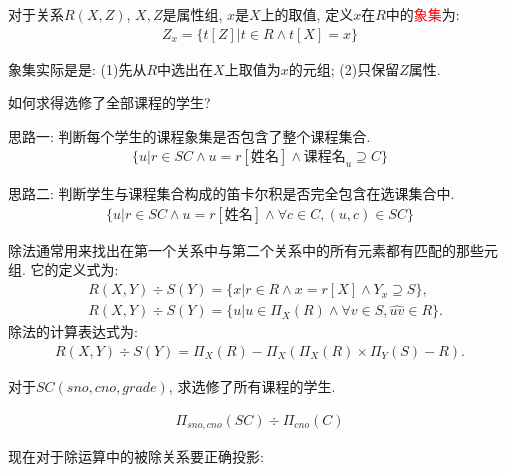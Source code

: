 \begin{definition}
    对于关系$R(X,Z)$, $X,Z$是属性组, $x$是$X$上的取值, 定义$x$在$R$中的\textcolor{red}{象集}为:
\begin{align*}
    Z_x = \{t[Z] | t\in R \land t[X]=x\}
\end{align*}
\end{definition}

\begin{remark}
    象集实际是是: (1)先从$R$中选出在$X$上取值为$x$的元组; (2)只保留$Z$属性.
\end{remark}

\begin{example}
如何求得选修了全部课程的学生?
\end{example}

思路一: 判断每个学生的课程象集是否包含了整个课程集合.
\begin{align*}
    \{u|r\in SC \land u=r[\text{姓名}] \land \text{课程名}_u \supseteq C \}
\end{align*}

思路二: 判断学生与课程集合构成的笛卡尔积是否完全包含在选课集合中.
\begin{align*}
    \{u|r\in SC \land u=r[\text{姓名}] \land \forall c\in C, (u,c)\in SC\}    
\end{align*}

\begin{definition}[除法]
除法通常用来找出在第一个关系中与第二个关系中的所有元素都有匹配的那些元组. 它的定义式为:
\begin{align*}
    &R(X,Y) \div S(Y) = \{x|r\in R\land x=r[X] \land Y_x \supseteq S\}, \\
    &R(X,Y) \div S(Y) = \{u|u\in \Pi_X(R) \land \forall v \in S, \widehat{uv} \in R \}.
\end{align*}
除法的计算表达式为:
\begin{align*}
    R(X,Y) \div S(Y) = \Pi_X(R) - \Pi_X(\Pi_X(R)\times \Pi_Y(S) - R).
\end{align*}
\end{definition}

\begin{example}
对于$SC(sno,cno,grade)$, 求选修了所有课程的学生.
\end{example}

\begin{align*}
    \Pi_{sno,cno}(SC) \div \Pi_{cno}(C)
\end{align*}

现在对于除运算中的被除关系要正确投影:

